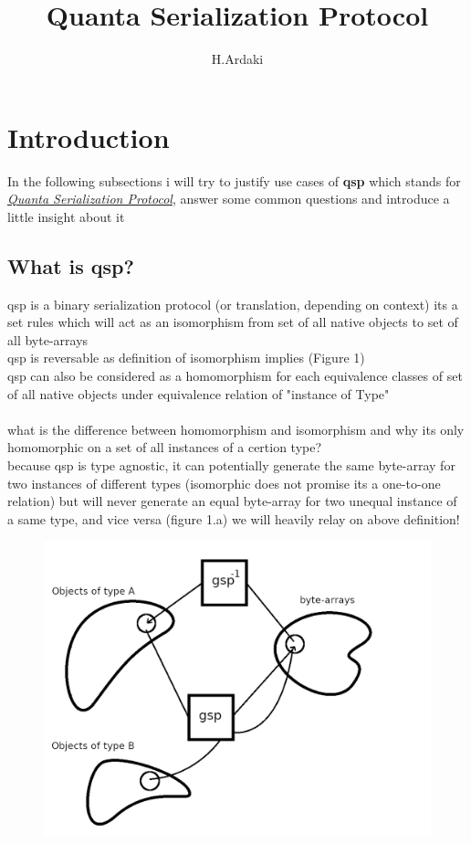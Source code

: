 \documentclass[11pt]{article}
\title{Quanta Serialization Protocol}
\author{H.Ardaki}
\begin{document}
\maketitle


\section{Introduction}

In the following subsections i will try to justify use cases of \textbf{qsp} which stands for \underline{\textit{Quanta Serialization Protocol}}, answer some common questions and introduce a little insight about it


\subsection{What is qsp?}

qsp is a binary serialization protocol (or translation, depending on context)
its a set rules which will act as an isomorphism from set of all native objects to set of all byte-arrays\\
qsp is reversable as definition of isomorphism implies (Figure 1)\\
qsp can also be considered as a homomorphism for each 
equivalence classes of set of all native objects under equivalence relation of "instance of Type"\\\\
what is the difference between homomorphism and isomorphism and why its only homomorphic on a set of all instances of a certion type?\\
because qsp is type agnostic, it can potentially generate the same byte-array for two instances of different types (isomorphic does not promise its a one-to-one relation) but will never generate an equal byte-array for two unequal instance of a same type, and vice versa (figure 1.a)
we will heavily relay on above definition!
\pagebreak

\begin{figure}[h]
	\centering
	\includegraphics{gsp_iso.png}
	\caption{}
\end{figure}
\end{document}
